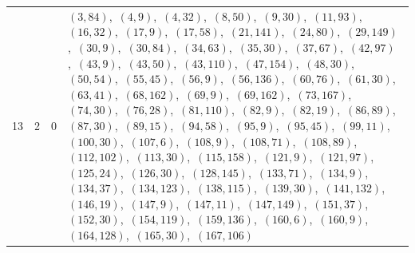 \documentclass[11pt]{article}
\begin{document}
{\begin{longtable}{@{}rrl>{\raggedright\arraybackslash}p{}@{}}
13 & 2 & $0$ & $(3,84)$,\allowbreak\ $(4,9)$,\allowbreak\ $(4,32)$,\allowbreak\ $(8,50)$,\allowbreak\ $(9,30)$,\allowbreak\ $(11,93)$,\allowbreak\ $(16,32)$,\allowbreak\ $(17,9)$,\allowbreak\ $(17,58)$,\allowbreak\ $(21,141)$,\allowbreak\ $(24,80)$,\allowbreak\ $(29,149)$,\allowbreak\ $(30,9)$,\allowbreak\ $(30,84)$,\allowbreak\ $(34,63)$,\allowbreak\ $(35,30)$,\allowbreak\ $(37,67)$,\allowbreak\ $(42,97)$,\allowbreak\ $(43,9)$,\allowbreak\ $(43,50)$,\allowbreak\ $(43,110)$,\allowbreak\ $(47,154)$,\allowbreak\ $(48,30)$,\allowbreak\ $(50,54)$,\allowbreak\ $(55,45)$,\allowbreak\ $(56,9)$,\allowbreak\ $(56,136)$,\allowbreak\ $(60,76)$,\allowbreak\ $(61,30)$,\allowbreak\ $(63,41)$,\allowbreak\ $(68,162)$,\allowbreak\ $(69,9)$,\allowbreak\ $(69,162)$,\allowbreak\ $(73,167)$,\allowbreak\ $(74,30)$,\allowbreak\ $(76,28)$,\allowbreak\ $(81,110)$,\allowbreak\ $(82,9)$,\allowbreak\ $(82,19)$,\allowbreak\ $(86,89)$,\allowbreak\ $(87,30)$,\allowbreak\ $(89,15)$,\allowbreak\ $(94,58)$,\allowbreak\ $(95,9)$,\allowbreak\ $(95,45)$,\allowbreak\ $(99,11)$,\allowbreak\ $(100,30)$,\allowbreak\ $(107,6)$,\allowbreak\ $(108,9)$,\allowbreak\ $(108,71)$,\allowbreak\ $(108,89)$,\allowbreak\ $(112,102)$,\allowbreak\ $(113,30)$,\allowbreak\ $(115,158)$,\allowbreak\ $(121,9)$,\allowbreak\ $(121,97)$,\allowbreak\ $(125,24)$,\allowbreak\ $(126,30)$,\allowbreak\ $(128,145)$,\allowbreak\ $(133,71)$,\allowbreak\ $(134,9)$,\allowbreak\ $(134,37)$,\allowbreak\ $(134,123)$,\allowbreak\ $(138,115)$,\allowbreak\ $(139,30)$,\allowbreak\ $(141,132)$,\allowbreak\ $(146,19)$,\allowbreak\ $(147,9)$,\allowbreak\ $(147,11)$,\allowbreak\ $(147,149)$,\allowbreak\ $(151,37)$,\allowbreak\ $(152,30)$,\allowbreak\ $(154,119)$,\allowbreak\ $(159,136)$,\allowbreak\ $(160,6)$,\allowbreak\ $(160,9)$,\allowbreak\ $(164,128)$,\allowbreak\ $(165,30)$,\allowbreak\ $(167,106)$\\

\end{longtable}}
\end{document}
